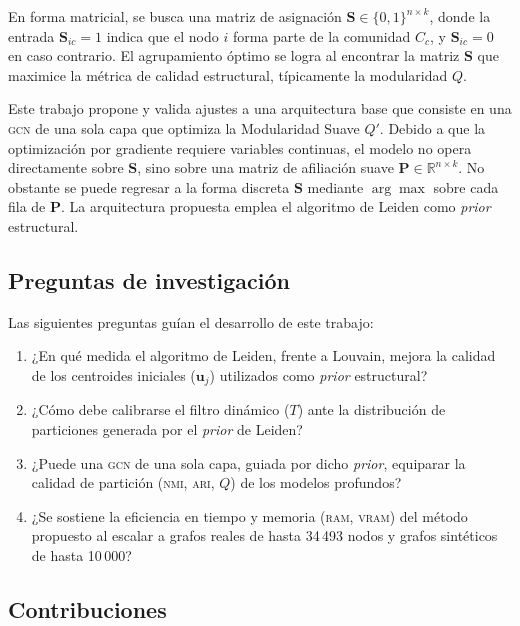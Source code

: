 \documentclass[twoside,twocolumn,10pt]{article}
\begin{document}
En forma matricial, se busca una matriz de asignación $\mathbf{S} \in \{0, 1\}^{n \times k}$, donde la entrada $\mathbf{S}_{ic} = 1$ indica que el nodo $i$ forma parte de la comunidad $C_c$, y $\mathbf{S}_{ic} = 0$ en caso contrario. El agrupamiento óptimo se logra al encontrar la matriz $\mathbf{S}$ que maximice la métrica de calidad estructural, típicamente la modularidad $Q$.

Este trabajo propone y valida ajustes a una arquitectura base que consiste en una \textsc{gcn} de una sola capa que optimiza la Modularidad Suave $Q'$.
Debido a que la optimización por gradiente requiere variables continuas, el modelo no opera directamente sobre $\mathbf{S}$, sino sobre una matriz de afiliación suave $\mathbf{P} \in \mathbb{R}^{n \times k}$.
No obstante se puede regresar a la forma discreta $\mathbf{S}$ mediante $\arg\max$ sobre cada fila de $\mathbf{P}$.
La arquitectura propuesta emplea el algoritmo de Leiden \cite{Traag2019} como \textit{prior} estructural.

\subsection{Preguntas de investigación}
\label{subsec:preguntas}

Las siguientes preguntas guían el desarrollo de este trabajo:
\begin{enumerate}
    \item ¿En qué medida el algoritmo de Leiden, frente a Louvain,
    mejora la calidad de los centroides iniciales ($\mathbf{u}_j$) utilizados
    como \textit{prior} estructural?
    \item ¿Cómo debe calibrarse el filtro dinámico ($T$) ante la
    distribución de particiones generada por el \textit{prior} de
    Leiden?
    \item ¿Puede una \textsc{gcn} de una sola capa, guiada por dicho
    \textit{prior}, equiparar la calidad de partición (\textsc{nmi},
    \textsc{ari}, $Q$) de los modelos profundos?
    \item ¿Se sostiene la eficiencia en tiempo y memoria (\textsc{ram},
    \textsc{vram}) del método propuesto al escalar a grafos reales de
    hasta 34\,493 nodos y grafos sintéticos de hasta 10\,000?
\end{enumerate}

\subsection{Contribuciones}
\end{document}
